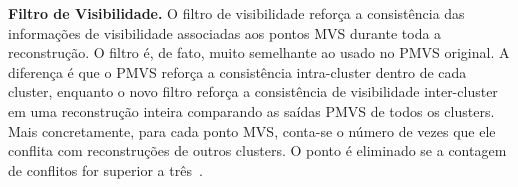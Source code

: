 \noindent\textbf{Filtro de Visibilidade.}
O filtro de visibilidade reforça a consistência das informações de visibilidade
associadas aos pontos MVS durante toda a reconstrução. O filtro é, de fato,
muito semelhante ao usado no PMVS original. A diferença é que o PMVS reforça a
consistência intra-cluster dentro de cada cluster, enquanto o novo filtro reforça
a consistência de visibilidade inter-cluster em uma reconstrução inteira
comparando as saídas PMVS de todos os clusters. Mais concretamente, para cada
ponto MVS, conta-se o número de vezes que ele conflita com reconstruções de
outros clusters. O ponto é eliminado se a contagem de
conflitos for superior a três~\cite{furukawa2010towards,furukawa2010accurate}.


